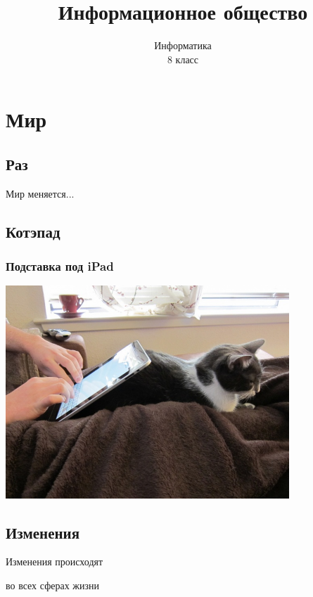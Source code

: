 \documentclass[compress,red]{beamer}
\title{Информационное общество}
\author{Информатика \\ 8 класс}
\begin{document}
\maketitle

\section{Мир}
\subsection{Раз}
\begin{frame}
  \begin{center}
    \Huge{Мир меняется...}
  \end{center}
\end{frame}


\subsection{Котэпад}
\begin{frame}[fragile]
\frametitle{Подставка под iPad}
\centerline{\includegraphics[width=0.8\textwidth]{images/cate.jpg}}
\end{frame}

\subsection{Изменения}
\begin{frame}
  \begin{center}
    \Huge{Изменения происходят}
    
    \Large{во всех сферах жизни}
  \end{center}
\end{frame}
\end{document}
